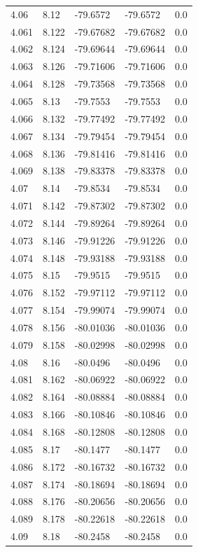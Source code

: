 \begin{tabular}{lllll}
4.06 & 8.12 & -79.6572 & -79.6572 & 0.0 \\
4.061 & 8.122 & -79.67682 & -79.67682 & 0.0 \\
4.062 & 8.124 & -79.69644 & -79.69644 & 0.0 \\
4.063 & 8.126 & -79.71606 & -79.71606 & 0.0 \\
4.064 & 8.128 & -79.73568 & -79.73568 & 0.0 \\
4.065 & 8.13 & -79.7553 & -79.7553 & 0.0 \\
4.066 & 8.132 & -79.77492 & -79.77492 & 0.0 \\
4.067 & 8.134 & -79.79454 & -79.79454 & 0.0 \\
4.068 & 8.136 & -79.81416 & -79.81416 & 0.0 \\
4.069 & 8.138 & -79.83378 & -79.83378 & 0.0 \\
4.07 & 8.14 & -79.8534 & -79.8534 & 0.0 \\
4.071 & 8.142 & -79.87302 & -79.87302 & 0.0 \\
4.072 & 8.144 & -79.89264 & -79.89264 & 0.0 \\
4.073 & 8.146 & -79.91226 & -79.91226 & 0.0 \\
4.074 & 8.148 & -79.93188 & -79.93188 & 0.0 \\
4.075 & 8.15 & -79.9515 & -79.9515 & 0.0 \\
4.076 & 8.152 & -79.97112 & -79.97112 & 0.0 \\
4.077 & 8.154 & -79.99074 & -79.99074 & 0.0 \\
4.078 & 8.156 & -80.01036 & -80.01036 & 0.0 \\
4.079 & 8.158 & -80.02998 & -80.02998 & 0.0 \\
4.08 & 8.16 & -80.0496 & -80.0496 & 0.0 \\
4.081 & 8.162 & -80.06922 & -80.06922 & 0.0 \\
4.082 & 8.164 & -80.08884 & -80.08884 & 0.0 \\
4.083 & 8.166 & -80.10846 & -80.10846 & 0.0 \\
4.084 & 8.168 & -80.12808 & -80.12808 & 0.0 \\
4.085 & 8.17 & -80.1477 & -80.1477 & 0.0 \\
4.086 & 8.172 & -80.16732 & -80.16732 & 0.0 \\
4.087 & 8.174 & -80.18694 & -80.18694 & 0.0 \\
4.088 & 8.176 & -80.20656 & -80.20656 & 0.0 \\
4.089 & 8.178 & -80.22618 & -80.22618 & 0.0 \\
4.09 & 8.18 & -80.2458 & -80.2458 & 0.0 \\

\end{tabular}
